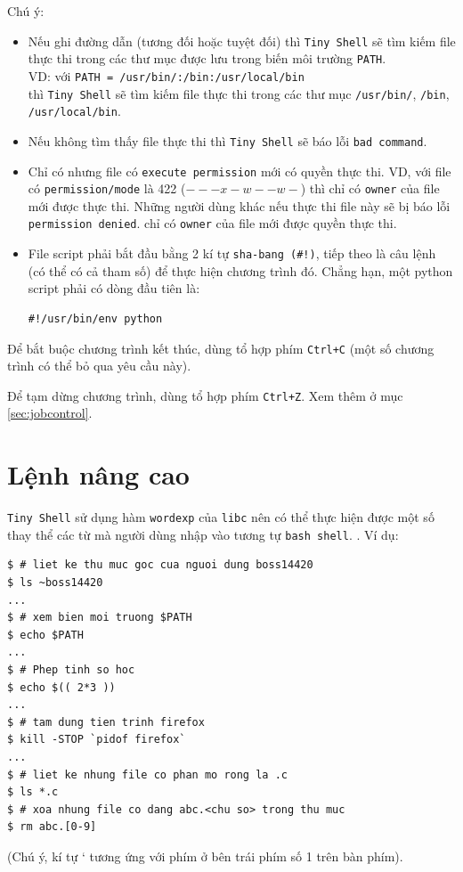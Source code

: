 \documentclass[a4paper,12pt]{report}
\begin{document}
    Chú ý:
    \begin{itemize}
        \item Nếu ghi đường dẫn (tương đối hoặc tuyệt đối) thì \texttt{Tiny
            Shell} sẽ tìm kiếm file thực thi trong các thư mục được lưu
            trong biến môi trường \texttt{PATH}. \\
            VD: với \texttt{PATH = /usr/bin/:/bin:/usr/local/bin} \\
            thì \texttt{Tiny Shell} sẽ tìm
            kiếm file thực thi trong các thư mục \texttt{/usr/bin/},
            \texttt{/bin}, \texttt{/usr/local/bin}.
        \item Nếu không tìm thấy file thực thi thì \texttt{Tiny Shell} sẽ
            báo lỗi \texttt{bad command}.
        \item Chỉ có nhưng file có \texttt{execute permission} mới có quyền
            thực thi. VD, với file có \texttt{permission/mode} là 422
            ($---x-w--w-$) thì chỉ có \texttt{owner} của file mới được thực
            thi. Những người dùng khác nếu thực thi file này sẽ bị báo lỗi
            \texttt{permission denied}.
            chỉ có \texttt{owner} của file mới được quyền thực thi.
        \item File script phải bắt đầu bằng 2 kí tự \texttt{sha-bang (\#!)},
            tiếp theo là câu lệnh (có thể có cả tham số) để thực hiện
            chương trình đó. Chẳng hạn, một python script phải có dòng đầu
            tiên là:\\
            \begin{verbatim}
#!/usr/bin/env python
            \end{verbatim}
    \end{itemize}

    Để bắt buộc chương trình kết thúc, dùng tổ hợp phím \texttt{Ctrl+C}
    (một số chương trình có thể bỏ qua yêu cầu này).

    Để tạm dừng chương trình, dùng tổ hợp phím \texttt{Ctrl+Z}. Xem thêm ở mục 
    \textcolor{blue}{\ref{sec:jobcontrol}}.

    \section{Lệnh nâng cao}
    \texttt{Tiny Shell} sử dụng hàm \texttt{wordexp} của \texttt{libc}
    nên có thể thực hiện được một số thay thể các từ mà người dùng nhập vào
    tương tự \texttt{bash shell}. \cite{LCWE}. Ví dụ:
    \begin{verbatim}
$ # liet ke thu muc goc cua nguoi dung boss14420
$ ls ~boss14420
...
$ # xem bien moi truong $PATH
$ echo $PATH
...
$ # Phep tinh so hoc
$ echo $(( 2*3 ))
...
$ # tam dung tien trinh firefox
$ kill -STOP `pidof firefox`
...
$ # liet ke nhung file co phan mo rong la .c
$ ls *.c
$ # xoa nhung file co dang abc.<chu so> trong thu muc
$ rm abc.[0-9]
    \end{verbatim}
(Chú ý, kí tự ` tương ứng với phím ở bên trái phím số 1 trên bàn phím).
\end{document}
